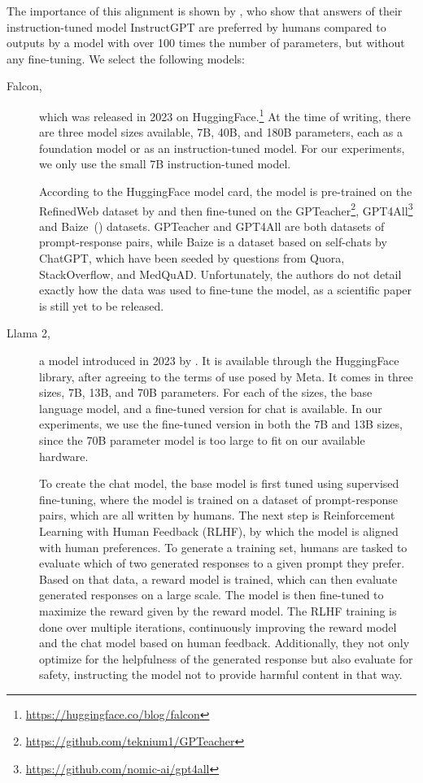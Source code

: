 The importance of this alignment is shown by \cite{ouyang:2022:Training}, who show that answers of their instruction-tuned model InstructGPT are preferred by humans compared to outputs by a model with over 100 times the number of parameters, but without any fine-tuning.
We select the following models:
\begin{description}
\item[Falcon,] which was released in 2023 on HuggingFace.\footnote{\url{https://huggingface.co/blog/falcon}}
At the time of writing, there are three model sizes available, 7B, 40B, and 180B parameters, each as a foundation model or as an instruction-tuned model.
For our experiments, we only use the small 7B instruction-tuned model.

According to the HuggingFace model card, the model is pre-trained on the RefinedWeb dataset by \cite{penedo:2023:The} and then fine-tuned on the GPTeacher\footnote{\url{https://github.com/teknium1/GPTeacher}}, GPT4All\footnote{\url{https://github.com/nomic-ai/gpt4all}} and Baize~(\cite{xu:2023:Baize}) datasets.
GPTeacher and GPT4All are both datasets of prompt-response pairs, while Baize is a dataset based on self-chats by ChatGPT, which have been seeded by questions from Quora, StackOverflow, and MedQuAD.
Unfortunately, the authors do not detail exactly how the data was used to fine-tune the model, as a scientific paper is still yet to be released.


\item[Llama 2,] a model introduced in 2023 by \cite{touvron:2023:Llama}.
It is available through the HuggingFace library, after agreeing to the terms of use posed by Meta.
It comes in three sizes, 7B, 13B, and 70B parameters.
For each of the sizes, the base language model, and a fine-tuned version for chat is available.
In our experiments, we use the fine-tuned version in both the 7B and 13B sizes, since the 70B parameter model is too large to fit on our available hardware.

To create the chat model, the base model is first tuned using supervised fine-tuning, where the model is trained on a dataset of prompt-response pairs, which are all written by humans.
The next step is Reinforcement Learning with Human Feedback (RLHF), by which the model is aligned with human preferences. 
To generate a training set, humans are tasked to evaluate which of two generated responses to a given prompt they prefer.
Based on that data, a reward model is trained, which can then evaluate generated responses on a large scale.
The model is then fine-tuned to maximize the reward given by the reward model.
The RLHF training is done over multiple iterations, continuously improving the reward model and the chat model based on human feedback.
Additionally, they not only optimize for the helpfulness of the generated response but also evaluate for safety, instructing the model not to provide harmful content in that way.



\end{description}
